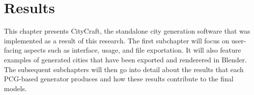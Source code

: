 \chapter{Results}

This chapter presents CityCraft, the standalone city generation software that was implemented as a result of this research.
The first subchapter will focus on user-facing aspects such as interface, usage, and file exportation.
It will also feature examples of generated cities that have been exported and renderered in Blender.
The subsequent subchapters will then go into detail about the results that each PCG-based generator produces and how these results contribute to the final models.









